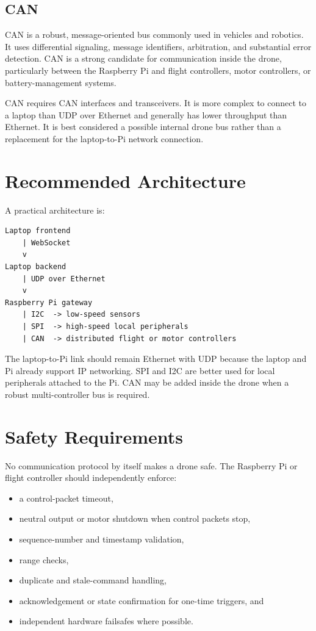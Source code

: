 \documentclass[11pt]{article}
\begin{document}
\subsection{CAN}

CAN is a robust, message-oriented bus commonly used in vehicles and robotics.
It uses differential signaling, message identifiers, arbitration, and
substantial error detection. CAN is a strong candidate for communication
inside the drone, particularly between the Raspberry Pi and flight
controllers, motor controllers, or battery-management systems.

CAN requires CAN interfaces and transceivers. It is more complex to connect
to a laptop than UDP over Ethernet and generally has lower throughput than
Ethernet. It is best considered a possible internal drone bus rather than a
replacement for the laptop-to-Pi network connection.

\section{Recommended Architecture}

A practical architecture is:

\begin{lstlisting}
Laptop frontend
    | WebSocket
    v
Laptop backend
    | UDP over Ethernet
    v
Raspberry Pi gateway
    | I2C  -> low-speed sensors
    | SPI  -> high-speed local peripherals
    | CAN  -> distributed flight or motor controllers
\end{lstlisting}

The laptop-to-Pi link should remain Ethernet with UDP because the laptop and
Pi already support IP networking. SPI and I2C are better used for local
peripherals attached to the Pi. CAN may be added inside the drone when a
robust multi-controller bus is required.

\section{Safety Requirements}

No communication protocol by itself makes a drone safe. The Raspberry Pi or
flight controller should independently enforce:

\begin{itemize}[leftmargin=*]
    \item a control-packet timeout,
    \item neutral output or motor shutdown when control packets stop,
    \item sequence-number and timestamp validation,
    \item range checks,
    \item duplicate and stale-command handling,
    \item acknowledgement or state confirmation for one-time triggers, and
    \item independent hardware failsafes where possible.
\end{itemize}
\end{document}
